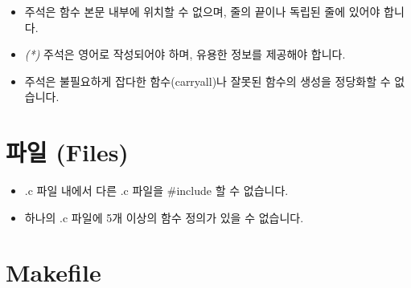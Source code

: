 \documentclass{42-ko}
\begin{document}
        \begin{itemize}

            \item 주석은 함수 본문 내부에 위치할 수 없으며, 줄의 끝이나 독립된 
              줄에 있어야 합니다.

            \item \textit{(*)} 주석은 영어로 작성되어야 하며, 유용한 정보를 
              제공해야 합니다.

            \item 주석은 불필요하게 잡다한 함수(carryall)나 잘못된 함수의 
              생성을 정당화할 수 없습니다.

        \end{itemize}
        \newpage


    \section{파일 (Files)}

        \begin{itemize}

            \item .c 파일 내에서 다른 .c 파일을 #include 할 수 없습니다.

            \item 하나의 .c 파일에 5개 이상의 함수 정의가 있을 수 없습니다.

        \end{itemize}
        \newpage


    \section{Makefile}
\end{document}
